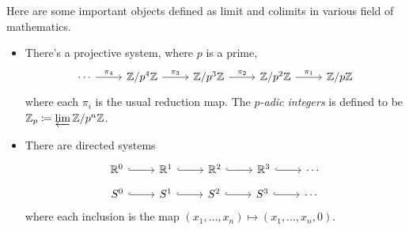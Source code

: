 \begin{example}\label{explimcolimex}
Here are some important objects defined as limit and colimits in various field of mathematics.
\begin{itemize}
\item There's a projective system, where $p$ is a prime,
\[\begin{tikzcd}[row sep=huge]
\cdots \arrow[r, "\pi_4"] & \zz/p^4\zz \arrow[r, "\pi_3"] & \zz/p^3\zz \arrow[r, "\pi_2"] & \zz/p^2\zz \arrow[r, "\pi_1"]                                                                                              & \zz/p\zz
\end{tikzcd}\]
where each $\pi_i$ is the usual reduction map. The \emph{$p$-adic integers} is defined to be $\mathbb Z_p \coloneqq \varprojlim \mathbb Z/p^n\mathbb Z$.
\item There are directed systems
\[\begin{tikzcd}[row sep=huge]
\rr^0 \arrow[r, hook] & \rr^1 \arrow[r, hook] & \rr^2 \arrow[r, hook] & \rr^3 \arrow[r, hook] & \cdots
\end{tikzcd}\]
\[\begin{tikzcd}[row sep=huge]
S^0 \arrow[r, hook] & S^1 \arrow[r, hook] & S^2 \arrow[r, hook] & S^3 \arrow[r, hook] & \cdots
\end{tikzcd}\]
where each inclusion is the map $(x_1,\ldots,x_n) \mapsto (x_1,\ldots,x_n,0)$.\\
\\

\end{itemize}
\end{example}
